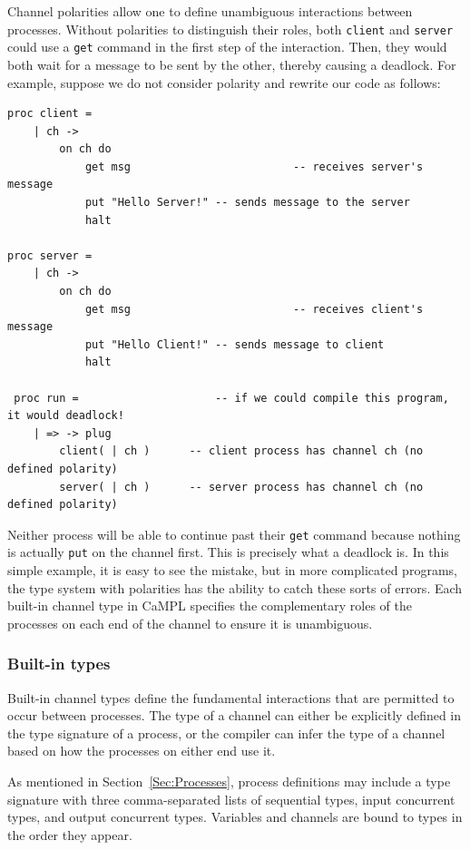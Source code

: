 \documentclass[11pt]{article}
\begin{document}
Channel polarities allow one to define unambiguous interactions between processes. 
Without polarities to distinguish their roles, both \lstinline$client$ and \lstinline$server$ could use a \lstinline$get$ command in the first step of the interaction.
Then, they would both wait for a message to be sent by the other, thereby causing a deadlock. 
For example, suppose we do not consider polarity and rewrite our code as follows:
\begin{lstlisting}[label=ex:ambiguityce, caption=Code without channel polarity (this code will not compile)] 
proc client = 
	| ch ->
		on ch do 
			get msg							-- receives server's message  
			put "Hello Server!"	-- sends message to the server      
			halt

proc server =  
	| ch ->
		on ch do
			get msg							-- receives client's message
			put "Hello Client!"	-- sends message to client
			halt

 proc run = 					-- if we could compile this program, it would deadlock!
 	| => -> plug
 		client( | ch )		-- client process has channel ch (no defined polarity)
 		server( | ch )		-- server process has channel ch (no defined polarity)
\end{lstlisting}
Neither process will be able to continue past their \lstinline{get} command because nothing is actually \lstinline{put} on the channel first.
This is precisely what a deadlock is.
In this simple example, it is easy to see the mistake, but in more complicated programs, the type system with polarities has the ability to catch these sorts of errors.
Each built-in channel type in CaMPL specifies the complementary roles of the processes on each end of the channel to ensure it is unambiguous.


\subsubsection{Built-in types}
\label{Sec:channeltypes}

Built-in channel types define the fundamental interactions that are permitted to occur between processes.
The type of a channel can either be explicitly defined in the type signature of a process, or the compiler can infer the type of a channel based on how the processes on either end use it.

As mentioned in Section~\ref{Sec:Processes}, process definitions may include a type signature with three comma-separated lists of sequential types, input concurrent types, and output concurrent types.
Variables and channels are bound to types in the order they appear.
\end{document}
